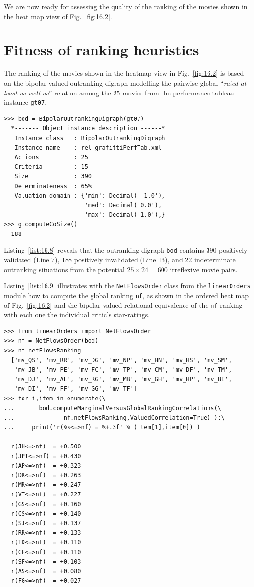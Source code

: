 We are now ready for assessing the quality of the \NetFlows ranking of the movies shown in the heat map view of Fig.~\vref{fig:16.2}. 

\section{Fitness of ranking heuristics}
\label{sec:16.3}

The \NetFlows ranking of the movies shown in the heatmap view in Fig.~\vref{fig:16.2} is based on the bipolar-valued outranking digraph modelling the pairwise global ``\emph{rated at least as well as}'' relation among the $25$ movies from the performance tableau instance \texttt{gt07}.
\begin{lstlisting}[caption={The bipolar-valued outranking digraph of the star-rated movies},label=list:16.8]
>>> bod = BipolarOutrankingDigraph(gt07)
  *------- Object instance description ------*
   Instance class   : BipolarOutrankingDigraph
   Instance name    : rel_grafittiPerfTab.xml
   Actions          : 25
   Criteria         : 15
   Size             : 390
   Determinateness  : 65%
   Valuation domain : {'min': Decimal('-1.0'),
                       'med': Decimal('0.0'),
                       'max': Decimal('1.0'),}
>>> g.computeCoSize()
  188
\end{lstlisting}
Listing~\vref{list:16.8} reveals that the outranking digraph \texttt{bod} contains $390$ positively validated (Line 7), $188$ positively invalidated (Line 13), and 22 indeterminate outranking situations from the potential $25 \times 24 = 600$ irreflexive movie pairs.

Listing~\vref{list:16.9} illustrates with the \texttt{NetFlowsOrder} class  from the \texttt{linearOr\-ders} module how to compute the global \NetFlows ranking \texttt{nf}, as shown in the ordered heat map of Fig.~\vref{fig:16.2} and the bipolar-valued relational equivalence of the \texttt{nf} ranking with each one the individual critic's star-ratings.
\begin{lstlisting}[caption={Computing marginal criterion correlations with global \NetFlows ranking},label=list:16.9]
>>> from linearOrders import NetFlowsOrder
>>> nf = NetFlowsOrder(bod)
>>> nf.netFlowsRanking
  ['mv_QS', 'mv_RR', 'mv_DG', 'mv_NP', 'mv_HN', 'mv_HS', 'mv_SM',
   'mv_JB', 'mv_PE', 'mv_FC', 'mv_TP', 'mv_CM', 'mv_DF', 'mv_TM',
   'mv_DJ', 'mv_AL', 'mv_RG', 'mv_MB', 'mv_GH', 'mv_HP', 'mv_BI',
   'mv_DI', 'mv_FF', 'mv_GG', 'mv_TF']
>>> for i,item in enumerate(\
...       bod.computeMarginalVersusGlobalRankingCorrelations(\
...              nf.netFlowsRanking,ValuedCorrelation=True) ):\
...     print('r(%s<=>nf) = %+.3f' % (item[1],item[0]) )   

  r(JH<=>nf)  = +0.500
  r(JPT<=>nf) = +0.430
  r(AP<=>nf)  = +0.323
  r(DR<=>nf)  = +0.263
  r(MR<=>nf)  = +0.247
  r(VT<=>nf)  = +0.227
  r(GS<=>nf)  = +0.160
  r(CS<=>nf)  = +0.140
  r(SJ<=>nf)  = +0.137
  r(RR<=>nf)  = +0.133
  r(TD<=>nf)  = +0.110
  r(CF<=>nf)  = +0.110
  r(SF<=>nf)  = +0.103
  r(AS<=>nf)  = +0.080
  r(FG<=>nf)  = +0.027
\end{lstlisting}


